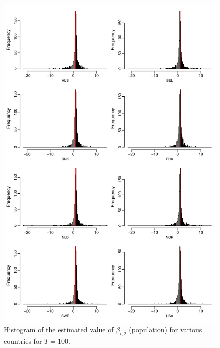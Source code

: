 \documentclass[a4paper,12pt]{article}
\begin{document}
\begin{enumerate}[label=\arabic*.,leftmargin=0.6cm]
{\begin{itemize}[topsep=0pt]
\begin{figure}[p!]
\includegraphics[width=\textwidth]{output/beta_pop_T_100}
\caption{Histogram of the estimated value of $\beta_{i, 2}$ (population) for various countries for $T = 100$.}\label{fig:para:pop:100}
\end{figure}
\begin{figure}[p!]

\end{figure}
\end{itemize}}
\end{enumerate}
\end{document}
